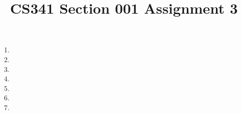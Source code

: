 \documentclass[12pt]{article}
\title{CS341 Section 001 Assignment 3}
\begin{document}
\maketitle

\begin{enumerate}
\item
\item
\item
\item
\item
\item
\item
\end{enumerate}
\end{document}
